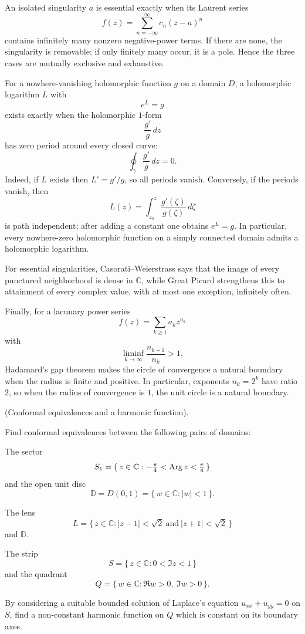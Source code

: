 \begin{solution}
An isolated singularity \(a\) is essential exactly when its Laurent series
\[
f(z)=\sum_{n=-\infty}^{\infty}c_n(z-a)^n
\]
contains infinitely many nonzero negative-power terms. If there are none, the singularity is removable; if only finitely many occur, it is a pole. Hence the three cases are mutually exclusive and exhaustive.

For a nowhere-vanishing holomorphic function \(g\) on a domain \(D\), a holomorphic logarithm \(L\) with
\[
e^L=g
\]
exists exactly when the holomorphic \(1\)-form
\[
\frac{g'}{g}\,dz
\]
has zero period around every closed curve:
\[
\oint_\gamma \frac{g'}{g}\,dz=0.
\]
Indeed, if \(L\) exists then \(L'=g'/g\), so all periods vanish. Conversely, if the periods vanish, then
\[
L(z)=\int_{z_0}^z\frac{g'(\zeta)}{g(\zeta)}\,d\zeta
\]
is path independent; after adding a constant one obtains \(e^L=g\). In particular, every nowhere-zero holomorphic function on a simply connected domain admits a holomorphic logarithm.

For essential singularities, Casorati--Weierstrass says that the image of every punctured neighborhood is dense in \(\mathbb C\), while Great Picard strengthens this to attainment of every complex value, with at most one exception, infinitely often.

Finally, for a lacunary power series
\[
f(z)=\sum_{k\ge1}a_kz^{n_k}
\]
with
\[
\liminf_{k\to\infty}\frac{n_{k+1}}{n_k}>1,
\]
Hadamard's gap theorem makes the circle of convergence a natural boundary when the radius is finite and positive. In particular, exponents \(n_k=2^k\) have ratio \(2\), so when the radius of convergence is \(1\), the unit circle is a natural boundary.
\end{solution}


\begin{problem}[CP-IV-0107]
\label{prob:cp-iv-0107}
(Conformal equivalences and a harmonic function).

Find conformal equivalences between the following pairs of domains:

	\par\noindent\textbullet\quad The sector
	\[
	S_1=\{\,z\in\mathbb{C} : -\tfrac{\pi}{4}<\operatorname{Arg} z<\tfrac{\pi}{4}\,\}
	\]
	and the open unit disc
	\[
	\mathbb{D}=D(0,1)=\{\,w\in\mathbb{C}:|w|<1\,\}.
	\]

	\par\noindent\textbullet\quad The lens
	\[
	L=\{\,z\in\mathbb{C} : |z-1|<\sqrt{2}\ \text{and}\ |z+1|<\sqrt{2}\,\}
	\]
	and $\mathbb{D}$.

	\par\noindent\textbullet\quad The strip
	\[
	S=\{\,z\in\mathbb{C} : 0<\Im z<1\,\}
	\]
	and the quadrant
	\[
	Q=\{\,w\in\mathbb{C} : \Re w>0,\ \Im w>0\,\}.
	\]

\noindent
By considering a suitable bounded solution of Laplace's equation $u_{xx}+u_{yy}=0$ on $S$,
find a non-constant harmonic function on $Q$ which is constant on its boundary axes.
\end{problem}

